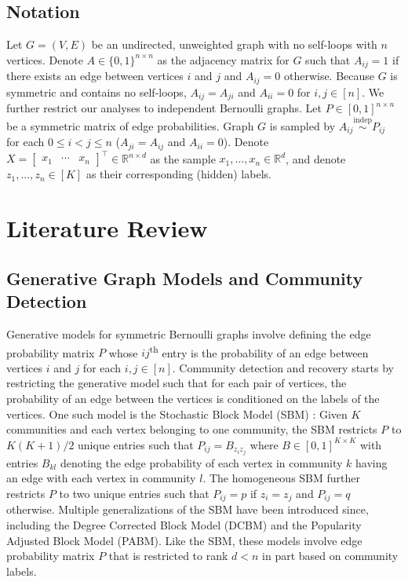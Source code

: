 \documentclass[
  11pt,
]{article}
\begin{document}
\hypertarget{notation}{%
\subsection{Notation}\label{notation}}

Let \(G = (V, E)\) be an undirected, unweighted graph with no self-loops
with \(n\) vertices. Denote \(A \in \{0, 1\}^{n \times n}\) as the
adjacency matrix for \(G\) such that \(A_{ij} = 1\) if there exists an
edge between vertices \(i\) and \(j\) and \(A_{ij} = 0\) otherwise.
Because \(G\) is symmetric and contains no self-loops,
\(A_{ij} = A_{ji}\) and \(A_{ii} = 0\) for \(i, j \in [n]\). We further
restrict our analyses to independent Bernoulli graphs. Let
\(P \in [0, 1]^{n \times n}\) be a symmetric matrix of edge
probabilities. Graph \(G\) is sampled by
\(A_{ij} \stackrel{\text{indep}}{\sim}P_{ij}\) for each
\(0 \leq i < j \leq n\) (\(A_{ji} = A_{ij}\) and \(A_{ii} = 0\)). Denote
\(X = \begin{bmatrix} x_1 & \cdots & x_n \end{bmatrix}^\top \in \mathbb{R}^{n \times d}\)
as the sample \(x_1, ..., x_n \in \mathbb{R}^d\), and denote
\(z_1, ..., z_n \in [K]\) as their corresponding (hidden) labels.

\hypertarget{literature-review}{%
\section{Literature Review}\label{literature-review}}

\hypertarget{generative-graph-models-and-community-detection}{%
\subsection{Generative Graph Models and Community
Detection}\label{generative-graph-models-and-community-detection}}

Generative models for symmetric Bernoulli graphs involve defining the
edge probability matrix \(P\) whose \(ij\)\textsuperscript{th} entry is
the probability of an edge between vertices \(i\) and \(j\) for each
\(i, j \in [n]\). Community detection and recovery starts by restricting
the generative model such that for each pair of vertices, the
probability of an edge between the vertices is conditioned on the labels
of the vertices. One such model is the Stochastic Block Model (SBM)
\cite{doi:10.1080/0022250X.1971.9989788}: Given \(K\) communities and
each vertex belonging to one community, the SBM restricts \(P\) to
\(K (K + 1) / 2\) unique entries such that \(P_{ij} = B_{z_i z_j}\)
where \(B \in [0, 1]^{K \times K}\) with entries \(B_{kl}\) denoting the
edge probability of each vertex in community \(k\) having an edge with
each vertex in community \(l\). The homogeneous SBM further restricts
\(P\) to two unique entries such that \(P_{ij} = p\) if \(z_i = z_j\)
and \(P_{ij} = q\) otherwise. Multiple generalizations of the SBM have
been introduced since, including the Degree Corrected Block Model (DCBM)
and the Popularity Adjusted Block Model (PABM). Like the SBM, these
models involve edge probability matrix \(P\) that is restricted to rank
\(d < n\) in part based on community labels.
\end{document}
